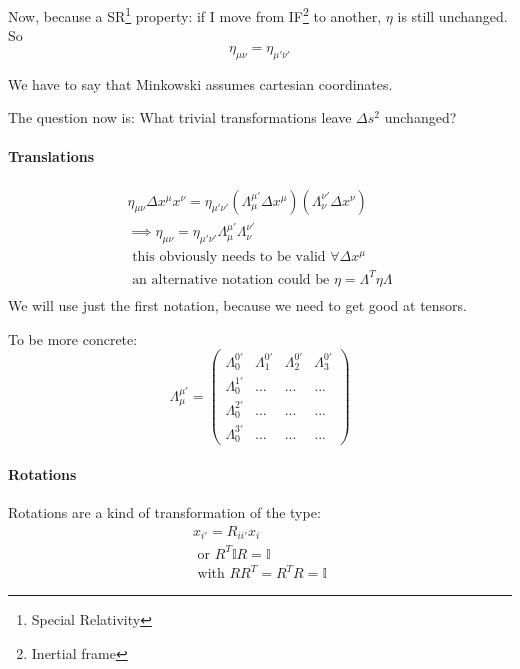 Now, because a SR\footnote{Special Relativity} property: if I move from IF\footnote{Inertial frame} to another, $\eta$ is still unchanged. So \[
\eta_{\mu \nu } = \eta_{\mu' \nu'}
\]

We have to say that Minkowski assumes cartesian coordinates.

The question now is: What trivial transformations leave $\Delta s^{2}$ unchanged?

\paragraph{Translations}
\begin{gather*}
\eta_{\mu  \nu }\Delta x^{\mu }x^{\nu } = \eta_{\mu' \nu'}\left( \Lambda^{\mu'}_{\mu }\Delta x^{\mu } \right) \left( \Lambda^{\nu'}_{\nu }\Delta x^{\nu } \right) \\
\implies \eta_{\mu  \nu } = \eta_{\mu' \nu'} \Lambda^{\mu'}_{\mu }\Lambda^{\nu'}_{\nu } \\
\text{ this obviously needs to be valid } \forall \Delta x^{\mu } \\
\text{ an alternative notation could be } \eta = \Lambda^{T} \eta \Lambda \\
\end{gather*}
We will use just the first notation, because we need to get good at tensors.

To be more concrete:
\begin{equation}
\Lambda^{\mu'}_{\mu } = \begin{pmatrix}
\Lambda^{0'}_{0} & \Lambda^{0'}_{1} & \Lambda^{0'}_{2} & \Lambda^{0'}_{3} \\
\Lambda^{1'}_{0} & ... & ... & ... \\
\Lambda^{2'}_{0} & ... & ... & ... \\
\Lambda^{3'}_{0} & ... & ... & ...
\end{pmatrix} 
\end{equation}

\paragraph{Rotations} 



Rotations are a kind of transformation of the type:
\begin{gather*}
x_{i'} = R_{i i'} x_{i} \\
\text{ or } R^{T} \mathbb{I} R = \mathbb{I} \\
\text{ with } RR^{T} = R^{T}R = \mathbb{I}
\end{gather*}

